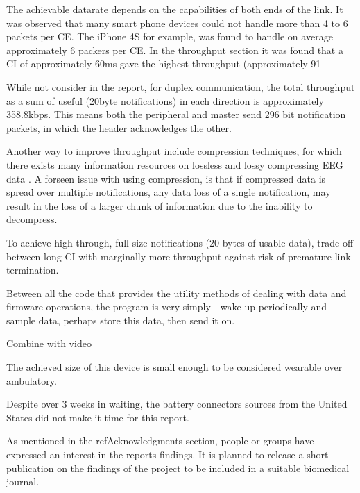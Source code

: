 \documentclass[]{article}
\begin{document}
The achievable datarate depends on the capabilities of both ends of the link. It was observed that many smart phone devices could not handle more than 4 to 6 packets per \ac{CE}. The iPhone 4S for example, was found to handle on average approximately 6 packers per \ac{CE}. In the throughput section it was found that a \ac{CI} of approximately 60ms gave the highest throughput (approximately 91%

While not consider in the report, for duplex communication, the total throughput as a sum of useful (20byte notifications) in each direction is approximately 358.8kbps. This means both the peripheral and master send 296 bit notification packets, in which the header acknowledges the other.

Another way to improve throughput include compression techniques, for which there exists many information resources on lossless and lossy compressing \ac{EEG} data \cite{Antoniol1997} \cite{Wongsawat2006}. A forseen issue with using compression, is that if compressed data is spread over multiple notifications, any data loss of a single notification, may result in the loss of a larger chunk of information due to the inability to decompress. 

To achieve high through, full size notifications (20 bytes of usable data), trade off between long \ac{CI} with marginally more throughput against risk of premature link termination.

Between all the code that provides the utility methods of dealing with data and firmware operations, the program is very simply - wake up periodically and sample data, perhaps store this data, then send it on. 

Combine with video

The achieved size of this device is small enough to be considered wearable over ambulatory. 

Despite over 3 weeks in waiting, the battery connectors sources from the United States did not make it time for this report. 




As mentioned in the ref{Acknowledgments} section, people or groups have expressed an interest in the reports findings. It is planned to release a short publication on the findings of the project to be included in a suitable biomedical journal. 
\end{document}
